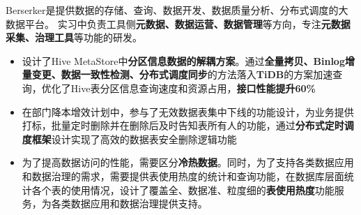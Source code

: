 \documentclass{resume}
\begin{document}
  

  Berserker是提供数据的存储、查询、数据开发、数据质量分析、分布式调度的大数据平台。
  实习中负责工具侧\textbf{元数据、数据运营、数据管理}等方向，专注\textbf{元数据采集、治理工具}等功能的研发。
  \begin{spacing}{1.2} 
  \begin{itemize}
    \item 设计了Hive MetaStore中\textbf{分区信息数据的解耦方案}。通过\textbf{全量拷贝、Binlog增量变更、数据一致性检测、分布式调度同步}的方法落入\textbf{TiDB}的方案加速查询，优化了Hive表分区信息查询速度和资源占用，\textbf{接口性能提升60\%}
    \item 在部门降本增效计划中，参与了无效数据表集中下线的功能设计，为业务提供打标，批量定时删除并在删除后及时告知表所有人的功能，通过\textbf{分布式定时调度框架}设计实现了高效的数据表安全删除逻辑功能
    \item 为了提高数据访问的性能，需要区分\textbf{冷热数据}。同时，为了支持各类数据应用和数据治理的需求，需要提供表使用热度的统计和查询功能，在数据库层面统计各个表的使用情况，设计了覆盖全、数据准、粒度细的\textbf{表使用热度}功能服务，为各类数据应用和数据治理提供支持。
  \end{itemize}
  \end{spacing} 

    

\end{document}
